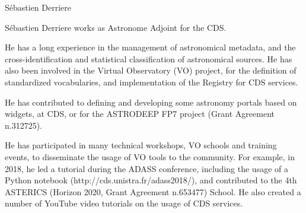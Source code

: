 \begin{participant}[type=R,PM=2,gender=male]{S\'ebastien Derriere}




  \par S\'ebastien Derriere works as Astronome Adjoint for the CDS.

  \par He has a long experience in the management of astronomical metadata, and the cross-identification and statistical classification of astronomical sources. He has also been involved in the Virtual Observatory (VO) project, for the definition of standardized vocabularies, and implementation of the Registry for CDS services.

  \par He has contributed to defining and developing some astronomy portals based on widgets, at CDS, or for the ASTRODEEP FP7 project (Grant Agreement n.312725).

  \par He has participated in many technical workshops, VO schools and training events, to disseminate the usage of VO tools to the community. For example, in 2018, he led a tutorial during the ADASS conference, including the usage of a Python notebook (http://cds.unistra.fr/adass2018/), and contributed to the 4th ASTERICS (Horizon 2020,  Grant Agreement n.653477) School. He also created a number of YouTube video tutorials on the usage of CDS services.

\end{participant}

